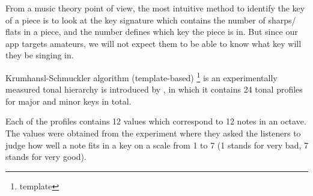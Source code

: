 From a music theory point of view, the most intuitive method to identify the key of a piece is to look at the key signature which contains the number of sharps/ flats
in a piece, and the number defines which key the piece is in. But since our app targets amateurs, we will not expect them to be able to know what key will they be singing
in.

Krumhansl-Schmuckler algorithm (template-based) \footnote{template} is an experimentally measured tonal hierarchy is introduced by \cite{templatedata}, in which it contains 
24 tonal profiles for major and minor keys in total. 

Each of the profiles contains 12 values which correspond to 12 notes in an octave. The values were obtained from the experiment where they asked the listeners to judge how well
a note fits in a key on a scale from 1 to 7 (1 stands for very bad, 7 stands for very good). 
